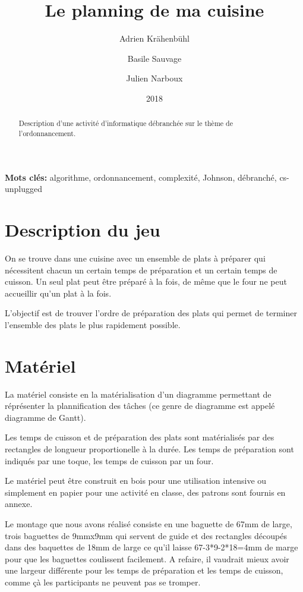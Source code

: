 \documentclass[a4paper]{article}
\title{Le planning de ma cuisine}
\author{Adrien Krähenbühl \and Basile Sauvage \and Julien Narboux}
\date{2018}
\begin{document}
\maketitle

\begin{abstract}
Description d'une activité d'informatique débranchée sur le thème de l'ordonnancement.
\end{abstract}

\smallskip

\textbf{Mots clés:} algorithme, ordonnancement, complexité, Johnson, débranché, cs-unplugged

\section{Description du jeu}

On se trouve dans une cuisine avec un ensemble de plats à préparer qui nécessitent chacun un certain temps de préparation et un certain temps de cuisson. Un seul plat peut être préparé à la fois, de même que le four ne peut accueillir qu'un plat à la fois.

L'objectif est de trouver l'ordre de préparation des plats qui permet de terminer l'ensemble des plats le plus rapidement possible.

\section{Matériel}

La matériel consiste en la matérialisation d'un diagramme permettant de réprésenter la plannification des tâches (ce genre de diagramme est appelé diagramme de Gantt).

Les temps de cuisson et de préparation des plats sont matérialisés par des rectangles de longueur proportionelle à la durée. Les temps de préparation sont indiqués par une toque, les temps de cuisson par un four.

Le matériel peut être construit en bois pour une utilisation intensive ou simplement en papier pour une activité en classe, des patrons sont fournis en annexe.

Le montage que nous avons réalisé consiste en une baguette de 67mm de large, trois baguettes de 9mmx9mm qui servent de guide et des rectangles découpés dans des baquettes de 18mm de large ce qu'il laisse 67-3*9-2*18=4mm de marge pour que les baguettes coulissent facilement. A refaire, il vaudrait mieux avoir une largeur différente pour les temps de préparation et les temps de cuisson, comme çà les participants ne peuvent pas se tromper.
\end{document}
